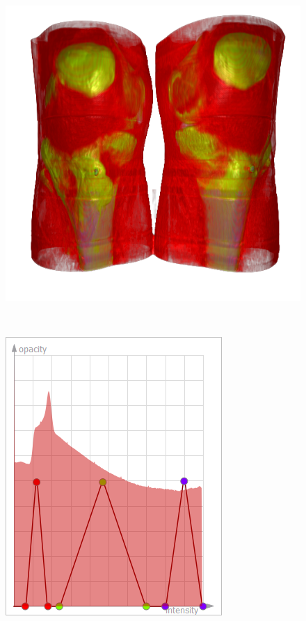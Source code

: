 \begin{figure}
	\centering
	\begin{minipage}{.29\textwidth}
		\includegraphics[width=1\linewidth]{images/CT-Knee_naive}
		\subcaption{}
	\end{minipage}~
	\begin{minipage}{.2\textwidth}
		\includegraphics[width=1\linewidth]{figures/tf_CT-Knee_naive}

\end{minipage}
\end{figure}
